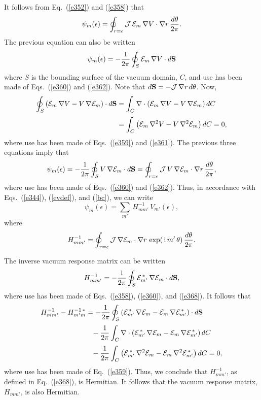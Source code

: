 \documentclass[12pt,prb,aps]{revtex4-1}
\begin{document}
It follows from Eq.~(\ref{e352}) and (\ref{e358}) that
\begin{equation}
\psi_m(\epsilon) = \oint_{r=\epsilon}{\cal J}\,{\cal E}_m\,\nabla V\cdot \nabla r\,\frac{d\theta}{2\pi}.
\end{equation}
The previous equation can also be written
\begin{equation}
\psi_m (\epsilon)=-\frac{1}{2\pi} \oint_{S}{\cal E}_m\,\nabla V\cdot d{\bf S}
\end{equation}
where $S$ is the bounding surface of the vacuum domain, $C$, and use has been made of Eqs.~(\ref{e360}) and (\ref{e362}). 
Note that $d{\bf S} = - {\cal J}\,{\nabla}r\,d\theta$.
Now,
\begin{align}
\oint_S\left({\cal E}_m\,\nabla V-V\,\nabla{\cal E}_m\right)\cdot d{\bf S}&=
\int_C\nabla\cdot\left({\cal E}_m\,\nabla V -V\,\nabla{\cal E}_m\right)dC\nonumber\\[0.5ex]
&
=\int_C\left({\cal E}_m\,\nabla^2 V - V\,\nabla^2{\cal E}_m\right)dC = 0,
\end{align}
where use has been made of Eqs.~(\ref{e359}) and (\ref{e361}). The previous three equations imply that 
\begin{equation}
\psi_m(\epsilon) = -\frac{1}{2\pi} \oint_{S}V\,\nabla {\cal E}_m\cdot d{\bf S}=  \oint_{r=\epsilon}{\cal J}\,V\,\nabla {\cal E}_m\cdot \nabla r\,\frac{d\theta}{2\pi},
\end{equation}
where  use has been made of Eqs.~(\ref{e360}) and (\ref{e362}).
Thus, in accordance with Eqs.~(\ref{e344}), (\ref{evdef}), and (\ref{bc}), we can
write
\begin{equation}
\psi_m(\epsilon) = \sum_{m'}\,H_{mm'}^{-1}\,V_{m'}(\epsilon),
\end{equation}
where 
\begin{equation}\label{e368}
H_{mm'}^{-1}=\oint_{r=\epsilon}{\cal J}\,\nabla {\cal E}_m\cdot \nabla r\,\exp(\,{\rm i}\,m'\,\theta)\,\frac{d\theta}{2\pi}.
\end{equation}

The inverse vacuum response matrix can be written
\begin{equation}\label{e369}
H_{mm'}^{-1} =-\frac{1}{2\pi}\oint_S {\cal E}_{m'}^{\,\ast}\,\nabla{\cal E}_m\cdot d{\bf S},
\end{equation}
where use has been made of Eqs.~(\ref{e358}), (\ref{e360}), and (\ref{e368}). It follows that
\begin{align}\label{e370}
H_{mm'}^{-1}-H_{m'm}^{-1\,\ast} &= -\frac{1}{2\pi}\oint_S\left({\cal E}_{m'}^{\,\ast}\,\nabla{\cal E}_m-{\cal E}_m\,\nabla{\cal E}_{m'}^{\,\ast}\right)\cdot
d{\bf S}\nonumber\\[0.5ex]
&\phantom{=}-\frac{1}{2\pi}\int_C\nabla\cdot\left({\cal E}_{m'}^{\,\ast}\,\nabla{\cal E}_m-{\cal E}_m\,\nabla{\cal E}_{m'}^{\,\ast}\right)dC\nonumber\\[0.5ex]
&\phantom{=}-\frac{1}{2\pi}\int_C\left({\cal E}_{m'}^{\,\ast}\,\nabla^2{\cal E}_m-{\cal E}_m\,\nabla^2{\cal E}_{m'}^{\,\ast}\right)dC=0,
\end{align}
where use has been made of Eq.~(\ref{e359}). Thus, we conclude that $H_{mm'}^{-1}$, as defined in Eq.~(\ref{e368}), is   Hermitian. It follows that the vacuum response matrix, $H_{mm'}$, is also Hermitian. 
\end{document}

